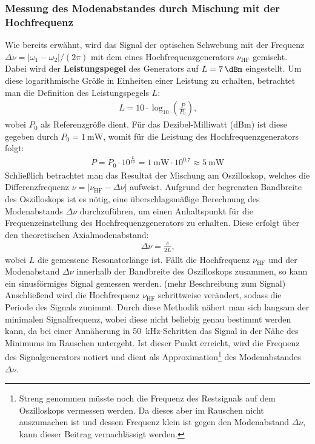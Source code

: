 \documentclass[11pt, a4paper]{article}
\numberwithin{equation}{section}
\begin{document}
\subsubsection{Messung des Modenabstandes durch Mischung mit der Hochfrequenz}
Wie bereits erwähnt, wird das Signal der optischen Schwebung mit der Frequenz $\Delta \nu = |\omega_1 - \omega_2| / (2\pi)$ mit dem eines Hochfrequenzgenerators $\nu_\mathrm{HF}$ gemischt.
Dabei wird der \textbf{Leistungspegel} des Generators auf $L = \SI{+7}{\dBm}$ eingestellt. Um diese logarithmische Größe in Einheiten einer Leistung zu erhalten, betrachtet man die Definition des Leistungspegels $L$: 
\begin{align}
	L = 10 \cdot \log_{10}\left( \frac{P}{P_0}\right) \text{,}
\end{align}
wobei $P_0$ als Referenzgröße dient.
Für das Dezibel-Milliwatt (\si{dBm}) ist diese gegeben durch $P_0 = \SI{1}{\milli\watt}$, womit für die Leistung des Hochfrequenzgenerators folgt:
\begin{align}
	P = P_0 \cdot 10^{\frac{L}{10}} = \SI{1}{\milli\watt} \cdot 10^{\num{0.7}} \approx \SI{5}{\milli\watt}
\end{align}
Schließlich betrachtet man das Resultat der Mischung am Oszilloskop, welches die Differenzfrequenz $\nu = |\nu_\mathrm{HF} - \Delta \nu|$ aufweist.
Aufgrund der begrenzten Bandbreite des Oszilloskops ist es nötig, eine überschlagsmäßige Berechnung des Modenabstands $\Delta \nu$ durchzuführen, um einen Anhaltspunkt für die Frequenzeinstellung des Hochfrequenzgenerators zu erhalten.
Diese erfolgt über den theoretischen Axialmodenabstand:
\begin{align}
	\Delta \nu = \frac{c}{2 L} \text{,}
	\label{eq:modenabstand}
\end{align}
wobei $L$ die gemessene Resonatorlänge ist.
Fällt die Hochfrequenz $\nu_\mathrm{HF}$ und der Modenabstand $\Delta \nu$ innerhalb der Bandbreite des Oszilloskops zusammen, so kann ein sinusförmiges Signal gemessen werden.
(mehr Beschreibung zum Signal)
Anschließend wird die Hochfrequenz $\nu_\mathrm{HF}$ schrittweise verändert, sodass die Periode des Signals zunimmt.
Durch diese Methodik nähert man sich langsam der minimalen Signalfrequenz, wobei diese nicht beliebig genau bestimmt werden kann, da bei einer Annäherung in \SI{50}{\kilo\hertz}-Schritten das Signal in der Nähe des Minimums im Rauschen untergeht.
Ist dieser Punkt erreicht, wird die Frequenz des Signalgenerators notiert und dient als Approximation\footnote{Streng genommen müsste noch die Frequenz des Restsignals auf dem Oszilloskops vermessen werden. Da dieses aber im Rauschen nicht auszumachen ist und dessen Frequenz klein ist gegen den Modenabstand $\Delta \nu$, kann dieser Beitrag vernachlässigt werden.} des Modenabstandes $\Delta \nu$.
\end{document}

